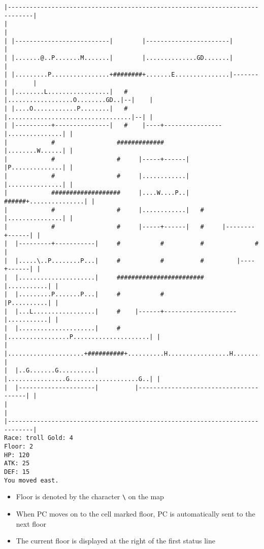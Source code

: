 \documentclass[11pt]{article}
\theoremstyle{plain}
\begin{document}
\begin{Verbatim}[fontsize=\small]
|-----------------------------------------------------------------------------|
|                                                                             |
| |--------------------------|        |-----------------------|               |
| |.......@..P.......M.......|        |..............GD.......|               |
| |.........P................+########+.......E...............|-------|       |
| |........L.................|   #    |..................O........GD..|--|    |
| |....O............P........|   #    |..................................|--| |
| |----------+---------------|   #    |----+----------------|...............| |
|            #                 #############                |........W......| |
|            #                 #     |-----+------|         |P..............| |
|            #                 #     |............|         |...............| |
|            ###################     |....W....P..|   ######+...............| |
|            #                 #     |............|   #     |...............| |
|            #                 #     |-----+------|   #     |--------+------| |
|  |---------+-----------|     #           #          #              #        |
|  |.....\..P........P...|     #           #          #         |----+------| |
|  |.....................|     ########################         |...........| |
|  |.........P.......P...|     #           #                    |P..........| |
|  |...L.................|     #    |------+--------------------|...........| |
|  |.....................|     #    |.................P.....................| |
|  |.....................+##########+..........H.................H..........| |
|  |..G.......G..........|          |................G...................G..| |
|  |---------------------|          |---------------------------------------| |
|                                                                             |
|-----------------------------------------------------------------------------|
Race: troll Gold: 4                                                    Floor: 2
HP: 120
ATK: 25
DEF: 15
You moved east. 
    \end{Verbatim}

\begin{itemize}
    \item Floor is denoted by the character \texttt{\textbackslash} on the map
    \item When PC moves on to the cell marked floor, PC is automatically
          sent to the next floor
    \item The current floor is displayed at the right of the first status line
\end{itemize}
\end{document}
